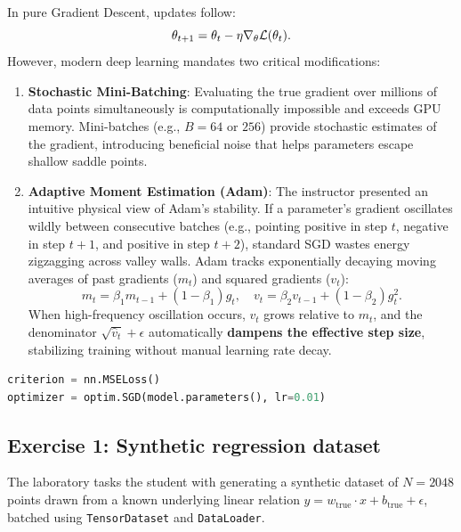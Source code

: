 \documentclass[../labs.tex]{subfiles}
\begin{document}
\begin{deepdive}
In pure Gradient Descent, updates follow:
\begin{equation}
\theta_{t+1} = \theta_t - \eta \nabla_\theta \mathcal{L}(\theta_t).
\end{equation}
However, modern deep learning mandates two critical modifications:
\begin{enumerate}
    \item \textbf{Stochastic Mini-Batching}: Evaluating the true gradient over millions of data points simultaneously is computationally impossible and exceeds GPU memory. Mini-batches (e.g., $B = 64$ or $256$) provide stochastic estimates of the gradient, introducing beneficial noise that helps parameters escape shallow saddle points.
    \item \textbf{Adaptive Moment Estimation (Adam)}: The instructor presented an intuitive physical view of Adam's stability. If a parameter's gradient oscillates wildly between consecutive batches (e.g., pointing positive in step $t$, negative in step $t+1$, and positive in step $t+2$), standard SGD wastes energy zigzagging across valley walls. Adam tracks exponentially decaying moving averages of past gradients ($m_t$) and squared gradients ($v_t$):
    \begin{equation}
    m_t = \beta_1 m_{t-1} + (1 - \beta_1) g_t, \quad v_t = \beta_2 v_{t-1} + (1 - \beta_2) g_t^2.
    \end{equation}
    When high-frequency oscillation occurs, $v_t$ grows relative to $m_t$, and the denominator $\sqrt{\hat{v}_t} + \epsilon$ automatically \textbf{dampens the effective step size}, stabilizing training without manual learning rate decay.
\end{enumerate}
\end{deepdive}

\begin{lstlisting}[language=Python, caption={Configuring loss function and SGD optimizer (Cell 20).}, label={lst:lab01_criterion_opt}]
criterion = nn.MSELoss()
optimizer = optim.SGD(model.parameters(), lr=0.01)
\end{lstlisting}

\subsection{Exercise 1: Synthetic regression dataset}
The laboratory tasks the student with generating a synthetic dataset of $N = 2048$ points drawn from a known underlying linear relation $y = w_{\text{true}} \cdot x + b_{\text{true}} + \epsilon$, batched using \texttt{TensorDataset} and \texttt{DataLoader}.
\end{document}
